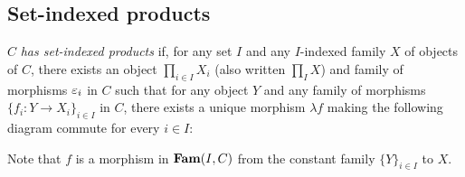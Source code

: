 \subsection{Set-indexed products}

$C$ \emph{has set-indexed products} if, for any set $I$ and any $I$-indexed family $X$ of objects of $C$,
there exists an object $\prod_{i \in I}X_i$ (also written $\prod_{I} X$) and family of morphisms $\varepsilon_i$ in
$C$ such that for any object $Y$ and any family of morphisms $\{f_i: Y \to X_i\}_{i \in I}$ in $C$, there
exists a unique morphism $\lambda f$ making the following diagram commute for every $i \in I$:

\begin{center}
\end{center}

Note that $f$ is a morphism in $\mathbf{Fam}(I,C)$ from the constant family $\{Y\}_{i \in I}$ to $X$.
